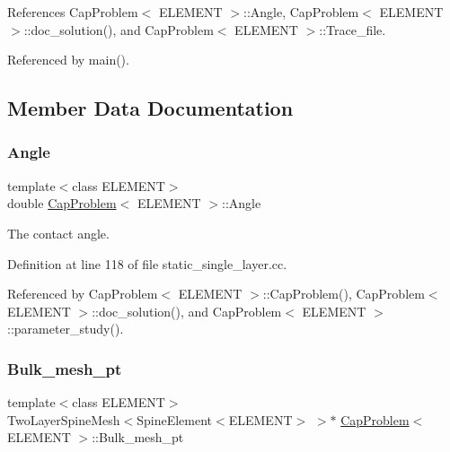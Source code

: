 References Cap\+Problem$<$ E\+L\+E\+M\+E\+N\+T $>$\+::\+Angle, Cap\+Problem$<$ E\+L\+E\+M\+E\+N\+T $>$\+::doc\+\_\+solution(), and Cap\+Problem$<$ E\+L\+E\+M\+E\+N\+T $>$\+::\+Trace\+\_\+file.



Referenced by main().



\subsection{Member Data Documentation}
\mbox{\label{classCapProblem_a7a57e45e3f1b7d30ae9d99bff56e8f5d}} 
\subsubsection{\texorpdfstring{Angle}{Angle}}
{\footnotesize\ttfamily template$<$class E\+L\+E\+M\+E\+NT$>$ \\
double \hyperlink{classCapProblem}{Cap\+Problem}$<$ E\+L\+E\+M\+E\+NT $>$\+::Angle\hspace{0.3cm}{\ttfamily [private]}}



The contact angle. 



Definition at line 118 of file static\+\_\+single\+\_\+layer.\+cc.



Referenced by Cap\+Problem$<$ E\+L\+E\+M\+E\+N\+T $>$\+::\+Cap\+Problem(), Cap\+Problem$<$ E\+L\+E\+M\+E\+N\+T $>$\+::doc\+\_\+solution(), and Cap\+Problem$<$ E\+L\+E\+M\+E\+N\+T $>$\+::parameter\+\_\+study().

\mbox{\label{classCapProblem_a98e8297aaedfba8624e3eb3aae29a237}} 
\subsubsection{\texorpdfstring{Bulk\+\_\+mesh\+\_\+pt}{Bulk\_mesh\_pt}\hspace{0.1cm}{\footnotesize\ttfamily [1/2]}}
{\footnotesize\ttfamily template$<$class E\+L\+E\+M\+E\+NT$>$ \\
Two\+Layer\+Spine\+Mesh$<$Spine\+Element$<$E\+L\+E\+M\+E\+NT$>$ $>$$\ast$ \hyperlink{classCapProblem}{Cap\+Problem}$<$ E\+L\+E\+M\+E\+NT $>$\+::Bulk\+\_\+mesh\+\_\+pt}



